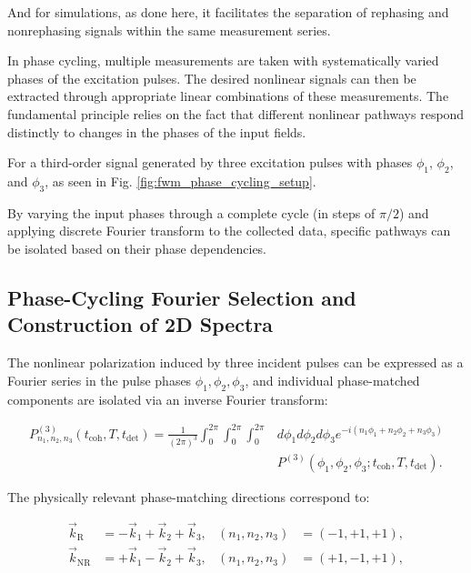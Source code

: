 \noindent 
And for simulations, as done here, it facilitates the separation of rephasing and nonrephasing signals within the same measurement series.

\noindent 
In phase cycling, multiple measurements are taken with systematically varied phases of the excitation pulses. The desired nonlinear signals can then be extracted through appropriate linear combinations of these measurements. The fundamental principle relies on the fact that different nonlinear pathways respond distinctly to changes in the phases of the input fields.

\noindent 
For a third-order signal generated by three excitation pulses with phases $\phi_1$, $\phi_2$, and $\phi_3$, as seen in Fig. \ref{fig:fwm_phase_cycling_setup}.

\noindent 
By varying the input phases through a complete cycle (in steps of $\pi/2$) and applying discrete Fourier transform to the collected data, specific pathways can be isolated based on their phase dependencies.


\subsection{Phase-Cycling Fourier Selection and Construction of 2D Spectra}
\label{subsec:phase_cycling_fourier_selection}


\noindent 
The nonlinear polarization induced by three incident pulses can be expressed as a Fourier series in the pulse phases $\phi_1, \phi_2, \phi_3$, and individual phase-matched components are isolated via an inverse Fourier transform:

\begin{align}
	P^{(3)}_{n_1,n_2,n_3}(t_{\text{coh}},T,t_{\text{det}}) =
	\frac{1}{(2\pi)^3} \int_{0}^{2\pi}	\int_{0}^{2\pi} \int_{0}^{2\pi}  
	& d\phi_1 d\phi_2 d\phi_3
	e^{-i(n_1\phi_1+n_2\phi_2+n_3\phi_3)} \\
	& P^{(3)}(\phi_1,\phi_2,\phi_3;t_{\text{coh}},T,t_{\text{det}}).
	\label{eq:continuous_phase_cycling}
\end{align}

\noindent 
The physically relevant phase-matching directions correspond to:

\begin{align}
	\vec{k}_{\mathrm{R}}  & = -\vec{k}_1 + \vec{k}_2 + \vec{k}_3,
	                      & (n_1,n_2,n_3)                         & = (-1,+1,+1), \label{eq:rephasing_selection}    \\
	\vec{k}_{\mathrm{NR}} & = +\vec{k}_1 - \vec{k}_2 + \vec{k}_3,
	                      & (n_1,n_2,n_3)                         & = (+1,-1,+1), \label{eq:nonrephasing_selection}
\end{align}

